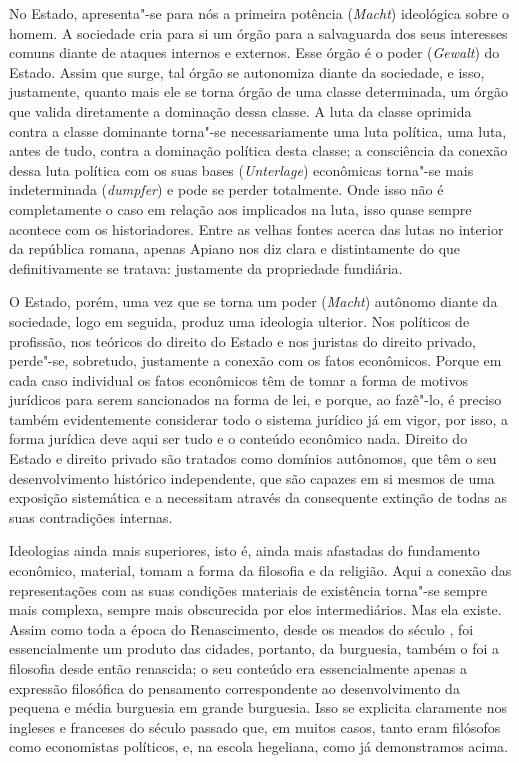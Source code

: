 No Estado, apresenta"-se para nós a primeira potência (\emph{Macht})
ideológica sobre o homem. A sociedade cria para si um órgão para a
salvaguarda dos seus interesses comuns diante de ataques internos e
externos. Esse órgão é o poder (\emph{Gewalt}) do Estado. Assim que
surge, tal órgão se autonomiza diante da sociedade, e isso, justamente,
quanto mais ele se torna órgão de uma classe determinada, um órgão que
valida diretamente a dominação dessa classe. A luta da classe oprimida
contra a classe dominante torna"-se necessariamente uma luta política,
uma luta, antes de tudo, contra a dominação política desta classe; a
consciência da conexão dessa luta política com os suas bases
(\emph{Unterlage}) econômicas torna"-se mais indeterminada
(\emph{dumpfer}) e pode se perder totalmente. Onde isso não é
completamente o caso em relação aos implicados na luta, isso quase
sempre acontece com os historiadores. Entre as velhas fontes acerca das
lutas no interior da república romana, apenas Apiano nos diz clara e distintamente do que definitivamente se tratava: justamente da
propriedade fundiária.

O Estado, porém, uma vez que se torna um poder (\emph{Macht}) autônomo
diante da sociedade, logo em seguida, produz uma ideologia ulterior. Nos
políticos de profissão, nos teóricos do direito do Estado e nos juristas
do direito privado, perde"-se, sobretudo, justamente a conexão com os
fatos econômicos. Porque em cada caso individual os fatos econômicos têm
de tomar a forma de motivos jurídicos para serem sancionados na forma de
lei, e porque, ao fazê"-lo, é preciso também evidentemente considerar
todo o sistema jurídico já em vigor, por isso, a forma jurídica deve
aqui ser tudo e o conteúdo econômico nada. Direito do Estado e direito
privado são tratados como domínios autônomos, que têm o seu
desenvolvimento histórico independente, que são capazes em si mesmos de
uma exposição sistemática e a necessitam através da consequente extinção
de todas as suas contradições internas.

Ideologias ainda mais superiores, isto é, ainda mais afastadas do
fundamento econômico, material, tomam a forma da filosofia e da
religião. Aqui a conexão das representações com as suas condições
materiais de existência torna"-se sempre mais complexa, sempre mais
obscurecida por elos intermediários. Mas ela existe. Assim como toda a
época do Renascimento, desde os meados do século , foi essencialmente
um produto das cidades, portanto, da burguesia, também o foi a filosofia
desde então renascida; o seu conteúdo era essencialmente apenas a
expressão filosófica do pensamento correspondente ao desenvolvimento da
pequena e média burguesia em grande burguesia. Isso se explicita
claramente nos ingleses e franceses do século passado que, em muitos
casos, tanto eram filósofos como economistas políticos, e, na escola
hegeliana, como já demonstramos acima.

